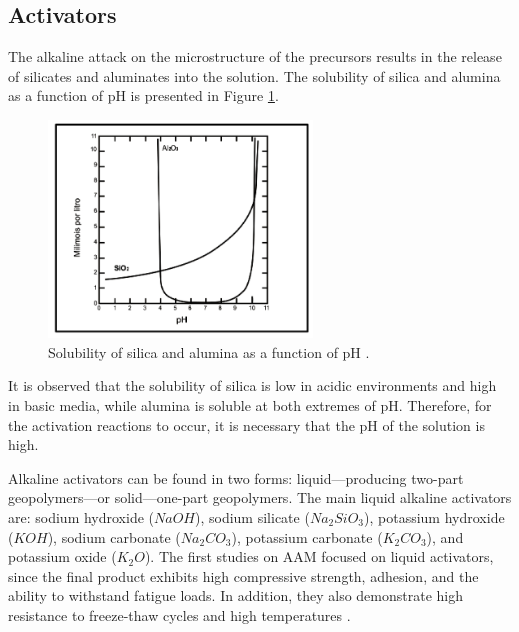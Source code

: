 

\subsection{Activators}

The alkaline attack on the microstructure of the precursors results in the release of silicates and aluminates into the solution.
The solubility of silica and alumina as a function of pH is presented in Figure \ref{fig:solubility}.

\begin{figure}[ht]
  \centering
  \includegraphics[width=0.625\textwidth]{Cap2/solubility.png}
  \caption{Solubility of silica and alumina as a function of pH \cite{mason1952principles}.}
  \label{fig:solubility}
\end{figure}

It is observed that the solubility of silica is low in acidic environments and high in basic media, while alumina is soluble at both extremes of pH.
Therefore, for the activation reactions to occur, it is necessary that the pH of the solution is high.

Alkaline activators can be found in two forms: liquid—producing two-part geopolymers—or solid—one-part geopolymers.
The main liquid alkaline activators are: sodium hydroxide ($NaOH$), sodium silicate ($Na_2SiO_3$), potassium hydroxide ($KOH$), sodium carbonate ($Na_2CO_3$), potassium carbonate ($K_2CO_3$), and potassium oxide ($K_2O$).
The first studies on AAM focused on liquid activators, since the final product exhibits high compressive strength, adhesion, and the ability to withstand fatigue loads. In addition, they also demonstrate high resistance to freeze-thaw cycles and high temperatures \cite{heath2014gwp}.

